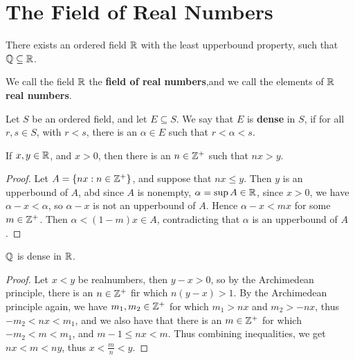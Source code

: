 
\section{The Field of Real Numbers}

\begin{theorem}\label{1.3.1}
    There exists an ordered field $\mathbb{R}$ with the least upperbound property, such that 
     $\mathbb{Q} \subseteq \mathbb{R}$.
\end{theorem}

\begin{definition}
    We call the field $\mathbb{R}$ the \textbf{field of real numbers},and we call the elements 
    of $\mathbb{R}$ \textbf{real numbers}.
\end{definition}

\begin{definition}
    Let $S$ be an ordered field, and let  $E \subseteq S$. We say that  $E$ is \textbf{dense} 
    in $S$, if for all $r,s \in S$, with $r<s$, there is an $\alpha \in E$ such that 
    $r<\alpha<s$.
\end{definition}

\begin{theorem}\label{1.3.2}
    If $x,y \in \mathbb{R}$, and  $x>0$, then there is an  $n \in \mathbb{Z}^+$ such that  $nx>y$.
\end{theorem}
\begin{proof}
    Let $A=\{nx: n \in \mathbb{Z}^+\}$, and suppose that  $nx \leq y$. Then  $y$ is an upperbound 
    of $A$, abd since  $A$ is nonempty,  $\alpha=\sup{A} \in \mathbb{R}$, since $x>0$, we have 
     $\alpha-x<\alpha$, so  $\alpha-x$ is not an upperbound of  $A$. Hence  $\alpha-x<mx$ for some 
     $m \in \mathbb{Z}^+$. Then  $\alpha<(1-m)x \in A$, contradicting that  $\alpha$ is an upperbound 
     of  $A$.
\end{proof}

\begin{theorem}\label{1.3.3}
    $\mathbb{Q}$ is dense in  $\mathbb{R}$.
\end{theorem}
\begin{proof}
    Let $x<y$ be realnumbers, then  $y-x>0$, so by the Archimedean principle, there is 
    an $n \in \mathbb{Z}^+$ fir which $n(y-x)>1$. By the Archimedean principle again, we have  
    $m_1,m_2 \in \mathbb{Z}^+$ for which $m_1>nx$ and $m_2>-nx$, thus $-m_2<nx<m_1$, and we also 
    have that there is an $m \in \mathbb{Z}^+$ for which  $-m_2<m<m_1$, and $m-1 \leq nx<m$. Thus 
    combining inequalities, we get  $nx<m<ny$, thus  $x<\frac{m}{n}<y$.
\end{proof}


